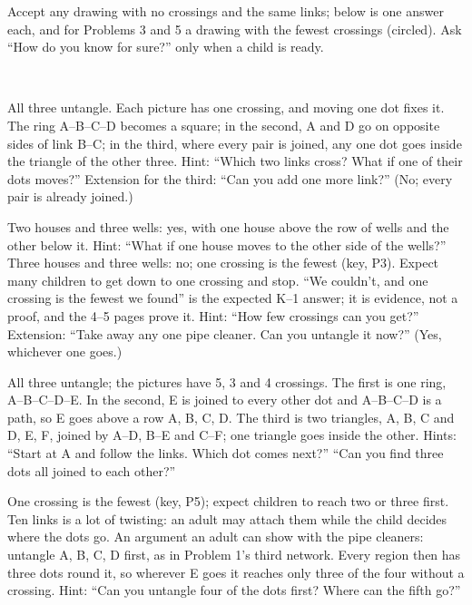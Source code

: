 Accept any drawing with no crossings and the same links; below is one answer each, and for Problems 3 and 5 a drawing with the fewest crossings (circled). Ask ``How do you know for sure?'' only when a child is ready.
\begin{center}
\hfill{}\hfill{}\hfill{}\hfill{}\\[6pt]
\qquad\qquad{}\qquad\qquad{}\qquad\qquad{}
\end{center}

All three untangle. Each picture has one crossing, and moving one dot fixes it. The ring A--B--C--D becomes a square; in the second, A and D go on opposite sides of link B--C; in the third, where every pair is joined, any one dot goes inside the triangle of the other three. Hint: ``Which two links cross? What if one of their dots moves?'' Extension for the third: ``Can you add one more link?'' (No; every pair is already joined.)

Two houses and three wells: yes, with one house above the row of wells and the other below it. Hint: ``What if one house moves to the other side of the wells?'' Three houses and three wells: no; one crossing is the fewest (key, P3). Expect many children to get down to one crossing and stop. ``We couldn't, and one crossing is the fewest we found'' is the expected K--1 answer; it is evidence, not a proof, and the 4--5 pages prove it. Hint: ``How few crossings can you get?'' Extension: ``Take away any one pipe cleaner. Can you untangle it now?'' (Yes, whichever one goes.)

All three untangle; the pictures have 5, 3 and 4 crossings. The first is one ring, A--B--C--D--E. In the second, E is joined to every other dot and A--B--C--D is a path, so E goes above a row A, B, C, D. The third is two triangles, A, B, C and D, E, F, joined by A--D, B--E and C--F; one triangle goes inside the other. Hints: ``Start at A and follow the links. Which dot comes next?'' ``Can you find three dots all joined to each other?''

One crossing is the fewest (key, P5); expect children to reach two or three first. Ten links is a lot of twisting: an adult may attach them while the child decides where the dots go. An argument an adult can show with the pipe cleaners: untangle A, B, C, D first, as in Problem 1's third network. Every region then has three dots round it, so wherever E goes it reaches only three of the four without a crossing. Hint: ``Can you untangle four of the dots first? Where can the fifth go?''

